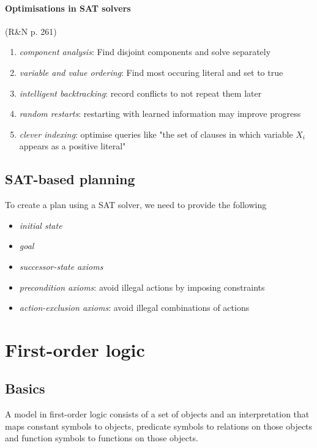 \documentclass{article}
\begin{document}
\paragraph{Optimisations in SAT solvers}
(R\&N p. 261)
\begin{enumerate}
    \item \emph{component analysis}: Find disjoint components and solve separately
    \item \emph{variable and value ordering}: Find most occuring literal and set to true
    \item \emph{intelligent backtracking}: record conflicts to not repeat them later
    \item \emph{random restarts}: restarting with learned information may improve progress
    \item \emph{clever indexing}: optimise queries like "the set of clauses in which variable $X_i$ appears as a positive literal"
\end{enumerate}

\subsection{SAT-based planning}

\begin{theorem}
    To create a plan using a SAT solver, we need to provide the following
    \begin{itemize}
        \item \emph{initial state}
        \item \emph{goal}
        \item \emph{successor-state axioms}
        \item \emph{precondition axioms}: avoid illegal actions by imposing constraints
        \item \emph{action-exclusion axioms}: avoid illegal combinations of actions
    \end{itemize}
\end{theorem}


\section{First-order logic}


\subsection{Basics}

\begin{definition}[R\&N p. 290]
    A model in first-order logic consists of a set of objects and an interpretation
    that maps constant symbols to objects, predicate symbols to relations on
    those objects and function symbols to functions on those objects.
\end{definition}
\end{document}

